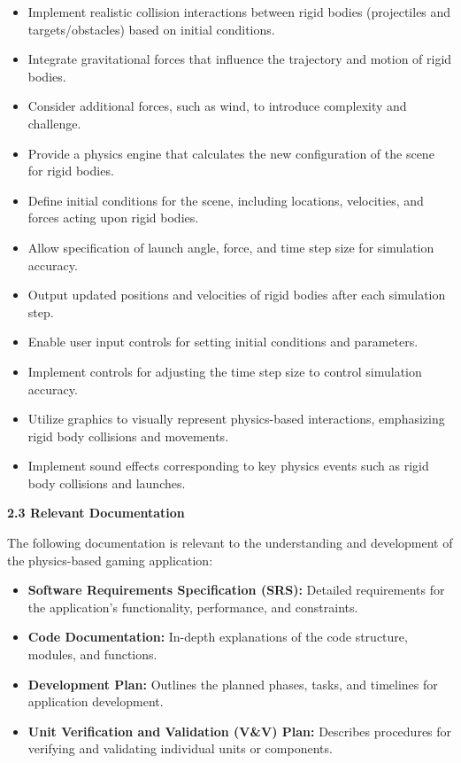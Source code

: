 \documentclass[
]{article}
\begin{document}
\begin{itemize}
\item
  Implement realistic collision interactions between rigid bodies
  (projectiles and targets/obstacles) based on initial conditions.
\item
  Integrate gravitational forces that influence the trajectory and
  motion of rigid bodies.
\item
  Consider additional forces, such as wind, to introduce complexity and
  challenge.
\item
  Provide a physics engine that calculates the new configuration of the
  scene for rigid bodies.
\item
  Define initial conditions for the scene, including locations,
  velocities, and forces acting upon rigid bodies.
\item
  Allow specification of launch angle, force, and time step size for
  simulation accuracy.
\item
  Output updated positions and velocities of rigid bodies after each
  simulation step.
\item
  Enable user input controls for setting initial conditions and
  parameters.
\item
  Implement controls for adjusting the time step size to control
  simulation accuracy.
\item
  Utilize graphics to visually represent physics-based interactions,
  emphasizing rigid body collisions and movements.
\item
  Implement sound effects corresponding to key physics events such as
  rigid body collisions and launches.
\end{itemize}

\protect\hypertarget{Aa5}{}{}\textbf{2.3 Relevant Documentation}

The following documentation is relevant to the understanding and
development of the physics-based gaming application:

\begin{itemize}
\item
  \textbf{Software Requirements Specification (SRS):} Detailed
  requirements for the application's functionality, performance, and
  constraints.
\item
  \textbf{Code Documentation:} In-depth explanations of the code
  structure, modules, and functions.
\item
  \textbf{Development Plan:} Outlines the planned phases, tasks, and
  timelines for application development.
\item
  \textbf{Unit Verification and Validation (V\&V) Plan:} Describes
  procedures for verifying and validating individual units or
  components.
\end{itemize}
\end{document}
